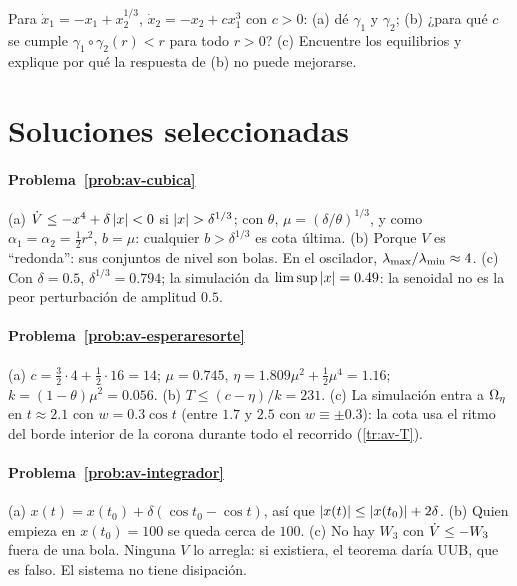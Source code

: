 \begin{problema}\label{prob:av-pgnolineal}
\etiquetaEstrella{} Para $\dot x_1=-x_1+x_2^{1/3}$, $\dot x_2=-x_2+cx_1^3$ con $c>0$: (a) dé $\gamma_1$ y $\gamma_2$; (b) ¿para qué $c$ se cumple $\gamma_1\circ\gamma_2(r)<r$ para todo $r>0$? (c) Encuentre los equilibrios y explique por qué la respuesta de (b) no puede mejorarse.
\end{problema}

\section{Soluciones seleccionadas}

\paragraph{Problema~\ref{prob:av-cubica}}
(a) $\dot V\le-x^4+\delta\left\lvert x\right\rvert<0$ si $\left\lvert x\right\rvert>\delta^{1/3}$; con $\theta$, $\mu=(\delta/\theta)^{1/3}$, y como $\alpha_1=\alpha_2=\tfrac12r^2$, $b=\mu$: cualquier $b>\delta^{1/3}$ es cota última. (b) Porque $V$ es ``redonda'': sus conjuntos de nivel son bolas. En el oscilador, $\lambda_{\max}/\lambda_{\min}\approx4$. (c) Con $\delta=0.5$, $\delta^{1/3}=0.794$; la simulación da $\limsup\left\lvert x\right\rvert=0.49$: la senoidal no es la peor perturbación de amplitud $0.5$.

\paragraph{Problema~\ref{prob:av-esperaresorte}}
(a) $c=\tfrac32\cdot4+\tfrac12\cdot16=14$; $\mu=0.745$, $\eta=1.809\mu^2+\tfrac12\mu^4=1.16$; $k=(1-\theta)\mu^2=0.056$. (b) $T\le(c-\eta)/k=231$. (c) La simulación entra a $\Omega_{\eta}$ en $t\approx2.1$ con $w=0.3\cos t$ (entre $1.7$ y $2.5$ con $w\equiv\pm0.3$): la cota usa el ritmo del borde interior de la corona durante todo el recorrido (\cref{tr:av-T}).

\paragraph{Problema~\ref{prob:av-integrador}}
(a) $x(t)=x(t_0)+\delta(\cos t_0-\cos t)$, así que $\left\lvert x(t)\right\rvert\le\left\lvert x(t_0)\right\rvert+2\delta$. (b) Quien empieza en $x(t_0)=100$ se queda cerca de $100$. (c) No hay $W_3$ con $\dot V\le-W_3$ fuera de una bola. Ninguna $V$ lo arregla: si existiera, el teorema daría UUB, que es falso. El sistema no tiene disipación.

